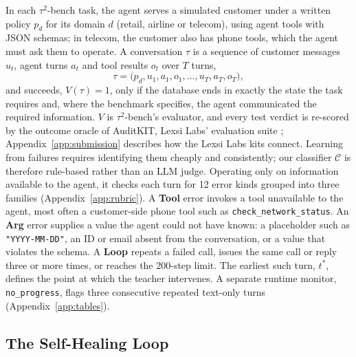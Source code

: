 \documentclass[11pt]{article}
\begin{document}
In each $\tau^2$-bench task, the agent serves a simulated customer under a written policy $p_d$ for its domain $d$ (retail, airline or telecom), using agent tools with JSON schemas; in telecom, the customer also has phone tools, which the agent must ask them to operate. A conversation $\tau$ is a sequence of customer messages $u_t$, agent turns $a_t$ and tool results $o_t$ over $T$ turns,
\begin{equation}
\tau = \big(p_d, u_1, a_1, o_1, \dots, u_T, a_T, o_T\big),
\end{equation}
and succeeds, $V(\tau)=1$, only if the database ends in exactly the state the task requires and, where the benchmark specifies, the agent communicated the required information. $V$ is $\tau^2$-bench's evaluator, and every test verdict is re-scored by the outcome oracle of AuditKIT, Lexsi Labs' evaluation suite \citep{Arora2026AuditKIT}; Appendix~\ref{app:submission} describes how the Lexsi Labs kits connect. Learning from failures requires identifying them cheaply and consistently; our classifier $\mathcal{C}$ is therefore rule-based rather than an LLM judge. Operating only on information available to the agent, it checks each turn for 12 error kinds grouped into three families (Appendix~\ref{app:rubric}). A \textbf{Tool} error invokes a tool unavailable to the agent, most often a customer-side phone tool such as \texttt{check\_network\_status}. An \textbf{Arg} error supplies a value the agent could not have known: a placeholder such as \texttt{"YYYY-MM-DD"}, an ID or email absent from the conversation, or a value that violates the schema. A \textbf{Loop} repeats a failed call, issues the same call or reply three or more times, or reaches the 200-step limit. The earliest such turn, $t^*$, defines the point at which the teacher intervenes. A separate runtime monitor, \texttt{no\_progress}, flags three consecutive repeated text-only turns (Appendix~\ref{app:tables}).

\subsection{The Self-Healing Loop}
\label{sec:method_loop}
\end{document}
